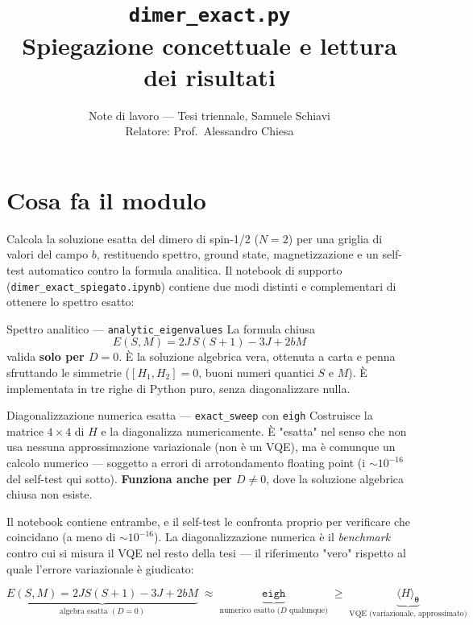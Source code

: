 \documentclass[11pt,a4paper]{article}
\title{\vspace{-1.5em}\color{inkblue}\texttt{dimer\_exact.py}\\[0.2em]
\Large\normalfont\color{softgray}Spiegazione concettuale e lettura dei risultati}
\author{Note di lavoro --- Tesi triennale, Samuele Schiavi\\ Relatore: Prof.\ Alessandro Chiesa}
\date{}
\begin{document}
\sloppy
\maketitle
\thispagestyle{fancy}
\vspace{-2.6em}

\section*{Cosa fa il modulo}

Calcola la soluzione esatta del dimero di spin-1/2 ($N=2$) per una
griglia di valori del campo $b$, restituendo spettro, ground state,
magnetizzazione e un self-test automatico contro la formula analitica.
Il notebook di supporto (\texttt{dimer\_exact\_spiegato.ipynb}) contiene
due modi distinti e complementari di ottenere lo spettro esatto:

\begin{panelbox}{Spettro analitico --- \texttt{analytic\_eigenvalues}}
La formula chiusa
\begin{equation}
E(S,M) = 2J\,S(S+1) - 3J + 2bM
\end{equation}
valida \textbf{solo per $D=0$}. È la soluzione algebrica vera, ottenuta a
carta e penna sfruttando le simmetrie ($[H_1,H_2]=0$, buoni numeri
quantici $S$ e $M$). È implementata in tre righe di Python puro, senza
diagonalizzare nulla.
\end{panelbox}
\smallskip

\begin{panelbox}{Diagonalizzazione numerica esatta --- \texttt{exact\_sweep} con \texttt{eigh}}
Costruisce la matrice $4\times4$ di $H$ e la diagonalizza numericamente.
È "esatta" nel senso che non usa nessuna approssimazione variazionale
(non è un VQE), ma è comunque un calcolo numerico --- soggetto a errori
di arrotondamento floating point (i $\sim10^{-16}$ del self-test qui
sotto). \textbf{Funziona anche per $D\neq0$}, dove la soluzione algebrica
chiusa non esiste.
\end{panelbox}

Il notebook contiene entrambe, e il self-test le confronta proprio per
verificare che coincidano (a meno di $\sim10^{-16}$). La diagonalizzazione
numerica è il \emph{benchmark} contro cui si misura il VQE nel resto
della tesi --- il riferimento "vero" rispetto al quale l'errore
variazionale è giudicato:

\begin{keyeq}
\centering
\footnotesize
\begin{equation*}
\underbrace{E(S,M) = 2JS(S+1)-3J+2bM}_{\text{algebra esatta }(D=0)}
\;\approx\;
\underbrace{\texttt{eigh}}_{\text{numerico esatto (}D\text{ qualunque)}}
\;\geq\;
\underbrace{\langle H\rangle_{\boldsymbol\theta}}_{\text{VQE (variazionale, approssimato)}}
\end{equation*}
\end{keyeq}
\end{document}
